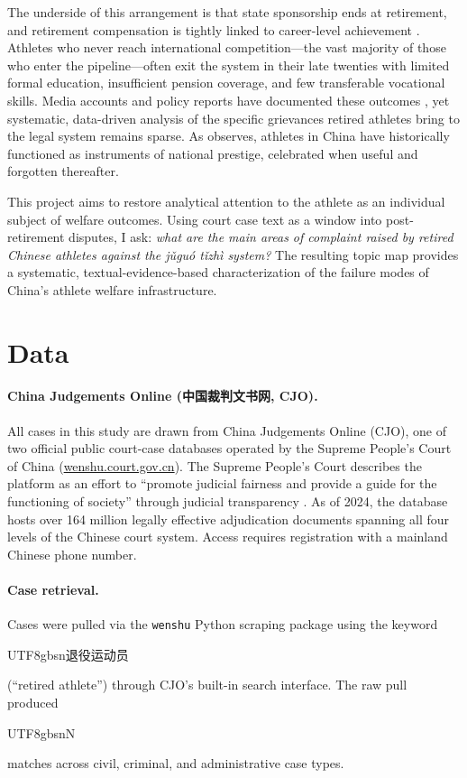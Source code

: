 \documentclass[10pt,letterpaper]{article}
\begin{document}
The underside of this arrangement is that state sponsorship ends at retirement, and retirement compensation is tightly linked to career-level achievement \citep{liu2014}. Athletes who never reach international competition---the vast majority of those who enter the pipeline---often exit the system in their late twenties with limited formal education, insufficient pension coverage, and few transferable vocational skills. Media accounts and policy reports have documented these outcomes \citep{xinhua2016}, yet systematic, data-driven analysis of the specific grievances retired athletes bring to the legal system remains sparse. As \citet{xu2008} observes, athletes in China have historically functioned as instruments of national prestige, celebrated when useful and forgotten thereafter.

This project aims to restore analytical attention to the athlete as an individual subject of welfare outcomes. Using court case text as a window into post-retirement disputes, I ask: \textit{what are the main areas of complaint raised by retired Chinese athletes against the jǔguó tǐzhì system?} The resulting topic map provides a systematic, textual-evidence-based characterization of the failure modes of China's athlete welfare infrastructure.

\section{Data}

\paragraph{China Judgements Online (中国裁判文书网, CJO).}
All cases in this study are drawn from China Judgements Online (CJO), one of two official public court-case databases operated by the Supreme People's Court of China (\url{wenshu.court.gov.cn}). The Supreme People's Court describes the platform as an effort to ``promote judicial fairness and provide a guide for the functioning of society'' through judicial transparency \citep{clarke2023}. As of 2024, the database hosts over 164 million legally effective adjudication documents spanning all four levels of the Chinese court system. Access requires registration with a mainland Chinese phone number.

\paragraph{Case retrieval.}
Cases were pulled via the \texttt{wenshu} Python scraping package using the keyword \begin{CJK}{UTF8}{gbsn}退役运动员\end{CJK} (``retired athlete'') through CJO's built-in search interface. The raw pull produced \begin{CJK}{UTF8}{gbsn}N\end{CJK} matches across civil, criminal, and administrative case types.
\end{document}
